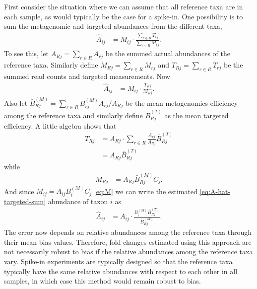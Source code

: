 \documentclass[
]{article}
\theoremstyle{definition}
\theoremstyle{definition}
\theoremstyle{definition}
\theoremstyle{definition}
\theoremstyle{remark}
\begin{document}
First consider the situation where we can assume that all reference taxa are in each sample, as would typically be the case for a spike-in.
One possibility is to sum the metagenomic and targeted abundances from the different taxa,
\begin{align}
  \label{eq:A-hat-targeted-sum}
  \hat A_{ij} &= M_{ij} \cdot \frac{\sum_{r \in R} T_{rj}}{\sum_{r \in R} M_{rj}}.
\end{align}
To see this, let \(A_{Rj} = \sum_{r \in R} A_{rj}\) be the summed actual abundances of the reference taxa.
Similarly define \(M_{Rj} = \sum_{r \in R} M_{rj}\) and \(T_{Rj} = \sum_{r \in R} T_{rj}\) be the summed read counts and targeted measurements.
Now
\begin{align}
  \hat A_{ij} &= M_{ij} \cdot \frac{T_{Rj}}{M_{Rj}}.
\end{align}
Also let \(\bar B^{(M)}_{Rj} = \sum_{r \in R} B^{(M)}_{rj} A_{rj} / A_{Rj}\) be the mean metagenomics efficiency among the reference taxa and similarly define \(\bar B^{(T)}_{Rj}\) as the mean targeted efficiency.
A little algebra shows that
\begin{align}
  \label{eq:T-Rj}
  T_{Rj} 
    &= A_{Rj} \cdot \sum_{r \in R} \frac{A_{rj}}{A_{Rj}} \bar B^{(T)}_{Rj}
  \\&= A_{Rj} \bar B^{(T)}_{Rj}
\end{align}
while
\begin{align}
  \label{eq:M-Rj}
  M_{Rj} &= A_{Rj} \bar B^{(M)}_{Rj} C_j.
\end{align}
And since \(M_{ij} = A_{ij} B^{(M)}_{i} C_j\) \eqref{eq:M} we can write the estimated \eqref{eq:A-hat-targeted-sum} abundance of taxon \(i\) as
\begin{align}
  \label{eq:error-targeted-sum}
  \hat A_{ij} &= A_{ij} \cdot \frac{B^{(M)}_i \bar B^{(T)}_{Rj}}{\bar B^{(M)}_{Rj}}.
\end{align}
The error now depends on relative abundances among the reference taxa through their mean bias values.
Therefore, fold changes estimated using this approach are not necessarily robust to bias if the relative abundances among the reference taxa vary.
Spike-in experiments are typically designed so that the reference taxa typically have the same relative abundances with respect to each other in all samples, in which case this method would remain robust to bias.
\end{document}
